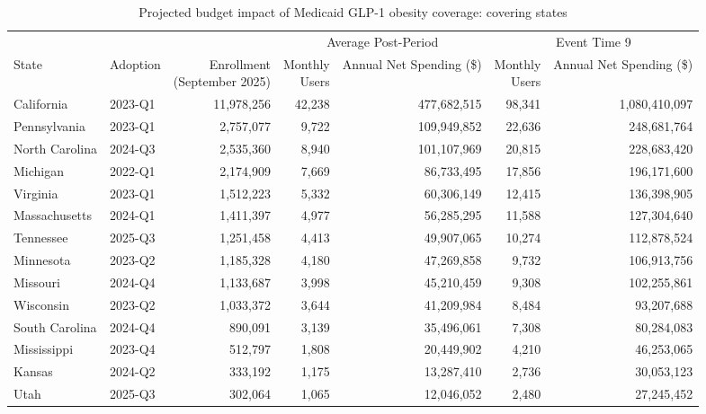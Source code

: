 \begin{landscape}
\pagestyle{lscaped}
\begin{table}[!htbp]
\centering
\caption{Projected budget impact of Medicaid GLP-1 obesity coverage: covering states}
\label{tab:budget_impact_covering}
\begin{tabular}{@{} l l r rr rr @{}}
\toprule
 & & & \multicolumn{2}{c}{Average Post-Period} & \multicolumn{2}{c}{Event Time 9} \\
\cmidrule(lr){4-5} \cmidrule(lr){6-7}
State & Adoption & \shortstack{Enrollment\\(September 2025)} & \shortstack{Monthly\\Users} & \shortstack{Annual Net\\Spending (\$)} & \shortstack{Monthly\\Users} & \shortstack{Annual Net\\Spending (\$)} \\
\midrule
  California & 2023-Q1 & 11,978,256 & 42,238 & 477,682,515 & 98,341 & 1,080,410,097 \\
  Pennsylvania & 2023-Q1 & 2,757,077 & 9,722 & 109,949,852 & 22,636 & 248,681,764 \\
  North Carolina & 2024-Q3 & 2,535,360 & 8,940 & 101,107,969 & 20,815 & 228,683,420 \\
  Michigan & 2022-Q1 & 2,174,909 & 7,669 & 86,733,495 & 17,856 & 196,171,600 \\
  Virginia & 2023-Q1 & 1,512,223 & 5,332 & 60,306,149 & 12,415 & 136,398,905 \\
  Massachusetts & 2024-Q1 & 1,411,397 & 4,977 & 56,285,295 & 11,588 & 127,304,640 \\
  Tennessee & 2025-Q3 & 1,251,458 & 4,413 & 49,907,065 & 10,274 & 112,878,524 \\
  Minnesota & 2023-Q2 & 1,185,328 & 4,180 & 47,269,858 & 9,732 & 106,913,756 \\
  Missouri & 2024-Q4 & 1,133,687 & 3,998 & 45,210,459 & 9,308 & 102,255,861 \\
  Wisconsin & 2023-Q2 & 1,033,372 & 3,644 & 41,209,984 & 8,484 & 93,207,688 \\
  South Carolina & 2024-Q4 & 890,091 & 3,139 & 35,496,061 & 7,308 & 80,284,083 \\
  Mississippi & 2023-Q4 & 512,797 & 1,808 & 20,449,902 & 4,210 & 46,253,065 \\
  Kansas & 2024-Q2 & 333,192 & 1,175 & 13,287,410 & 2,736 & 30,053,123 \\
  Utah & 2025-Q3 & 302,064 & 1,065 & 12,046,052 & 2,480 & 27,245,452 \\

\end{tabular}
\end{table}
\end{landscape}
